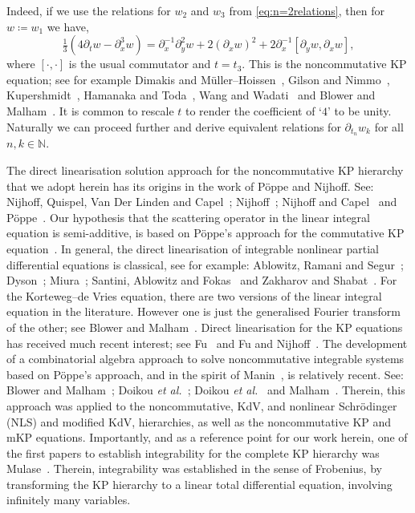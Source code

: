 \documentclass[5p,twocolumn]{elsarticle}
\newcommand*{\pa}{{\partial}}
\begin{document}
Indeed, if we use the relations for $w_2$ and $w_3$ from \eqref{eq:n=2relations}, then for $w\coloneqq w_1$ we have,
\begin{equation}\label{eq:ncKP}
  \tfrac13(4\pa_tw-\pa_x^3w)=\pa_x^{-1}\pa_y^2w+2(\pa_xw)^2+2\pa_x^{-1}[\pa_yw,\pa_xw],
\end{equation}
where $[\cdot,\cdot]$ is the usual commutator and $t=t_3$.
This is the noncommutative KP equation; see for example Dimakis and M\"uller--Hoissen~\cite{DMH}, Gilson and Nimmo~\cite{GN}, Kupershmidt~\cite{K},
Hamanaka and Toda~\cite{HamanakaToda}, Wang and Wadati~\cite{WW} and Blower and Malham~\cite{BM-KP}.
It is common to rescale $t$ to render the coefficient of `$4$' to be unity.
Naturally we can proceed further and derive equivalent relations for $\pa_{t_n}w_k$ for all $n,k\in\mathbb N$.

The direct linearisation solution approach for the noncommutative KP hierarchy that we adopt herein has its origins in the work of P\"oppe and Nijhoff.
See: Nijhoff, Quispel, Van Der Linden and Capel~\cite{NQVC}; Nijhoff~\cite{Nijhoff}; Nijhoff and Capel~\cite{NC} and P\"oppe~\cite{PSG,PKdV,PKP}.
Our hypothesis that the scattering operator in the linear integral equation is semi-additive, is based on P\"oppe's approach for the commutative KP equation~\cite{PKP}.
In general, the direct linearisation of integrable nonlinear partial differential equations is classical, see for example:
Ablowitz, Ramani and Segur~\cite{ARS}; Dyson~\cite{Dyson}; Miura~\cite{Miura}; Santini, Ablowitz and Fokas~\cite{SAF} and Zakharov and Shabat~\cite{ZS,ZS2}.
For the Korteweg--de Vries equation, there are two versions of the linear integral equation in the literature.
However one is just the generalised Fourier transform of the other; see Blower and Malham~\cite[App.~D]{BM-KP}.
Direct linearisation for the KP equations has received much recent interest; see Fu~\cite{Fu} and Fu and Nijhoff~\cite{FN1,FN2,FN3}.
The development of a combinatorial algebra approach to solve noncommutative integrable systems based on P\"oppe's approach, and in the spirit of Manin~\cite{Manin}, 
is relatively recent.
See: Blower and Malham~\cite{BM,BM-KP}; Doikou \textit{et al.\/}~\cite{DMS}; Doikou \textit{et al.\/}~\cite{DMSWc} and Malham~\cite{MNLS,MKdV}.
Therein, this approach was applied to the noncommutative, KdV, and nonlinear Schr\"odinger (NLS) and modified KdV, hierarchies, as well as the noncommutative KP and mKP equations.
Importantly, and as a reference point for our work herein, one of the first papers to establish integrability for the complete KP hierarchy was Mulase~\cite{Mu84}.
Therein, integrability was established in the sense of Frobenius, by transforming the KP hierarchy to a linear total differential equation, involving infinitely many variables.
\end{document}
